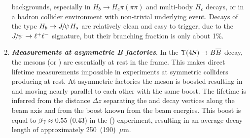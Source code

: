 \begin{enumerate}
  backgrounds, especially in $H_b\rightarrow H_c\pi(\pi\pi)$ and
  multi-body $H_c$ decays, or in a hadron collider environment with
  non-trivial underlying event.  Decays of the type $H_b\to {J\mskip -3mu/\mskip -2mu\psi\mskip 2mu} H_s$ are
  relatively clean and easy to trigger, due to the ${J\mskip -3mu/\mskip -2mu\psi\mskip 2mu}\to \ell^+\ell^-$
  signature, but their branching fraction is only about 1\%.
\item {\bf\em Measurements at asymmetric B factories}. 
  In the $\Ups\rightarrow B \bar{B}$ decay, the \B mesons (\Bu or \Bd) are
essentially at rest in the \Ups frame.  This makes direct lifetime
measurements impossible in experiments at symmetric colliders producing 
\Ups at rest. 
At asymmetric \B factories the \Ups meson is boosted
resulting in \B and  moving nearly parallel to each 
other with the same boost. The lifetime is inferred from the distance $\Delta z$        
separating the \B and  decay vertices along the beam axis 
and from the \Ups boost known from the beam energies. This boost is equal to 
$\beta \gamma \approx 0.55$ (0.43) in the \babar (\belle) experiment,
resulting in an average \B decay length of approximately 250~(190)~$\mu$m. 



\end{enumerate}
